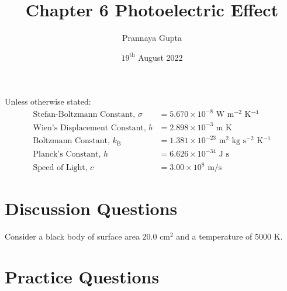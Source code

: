 \documentclass[a4paper, 12pt, addpoints]{exam}
\title{Chapter 6 \textbf{Photoelectric Effect}}
\author{Prannaya Gupta}
\date{$19^{\text{th}}$ August 2022}
\begin{document}
\maketitle


\begin{tcolorbox}
Unless otherwise stated:
\begin{align*}
\text{Stefan-Boltzmann Constant, }\sigma &= 5.670 \times 10^{-8}\text{ W m${}^{-2}$ K${}^{-4}$} \\
\text{Wien's Displacement Constant, }b &= 2.898 \times 10^{-3} \text{ m K} \\
\text{Boltzmann Constant, }k_\text{B} &= 1.381 \times 10^{-23}\text{ m${}^2$ kg s${}^{-2}$ K${}^{-1}$} \\
\text{Planck's Constant, }h &= 6.626 \times 10^{-34}\text{ J s} \\
\text{Speed of Light, }c &= 3.00 \times 10^8 \text{ m/s}
\end{align*}
\end{tcolorbox}
\newpage
\section{Discussion Questions}
\begin{questions}
\question Consider a black body of surface area $20.0\text{ cm}^2$ and a temperature of 5000 K.

\end{questions}
\newpage

\section{Practice Questions}

\begin{questions}
\question 

\end{questions}
\end{document}
